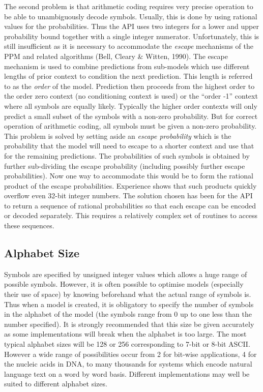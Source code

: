 \documentclass[11pt]{article}
\begin{document}
The second problem is that arithmetic coding requires very precise operation
to be able to unambiguously decode symbols. Usually, this is done by using
rational values for the probabilities. Thus the API uses two integers for a
lower and upper probability bound together with a single integer numerator.
Unfortunately, this is still insufficient as it is necessary to accommodate
the \emph{escape} mechanisms of the PPM and related algorithms (Bell, Cleary
\& Witten, 1990). The escape mechanism is used to combine predictions from
sub-models which use different lengths of prior context to condition the
next prediction. This length is referred to as the \emph{order} of the
model. Prediction then proceeds from the highest order to the order zero
context (no conditioning context is used) or the ``order -1'' context where
all symbols are equally likely. Typically the higher order contexts will
only predict a small subset of the symbols with a non-zero probability. But
for correct operation of arithmetic coding, all symbols must be given a
non-zero probability. This problem is solved by setting aside an \emph{%
escape probability} which is the probability that the model will need to
escape to a shorter context and use that for the remaining predictions. The
probabilities of such symbols is obtained by further sub-dividing the escape
probability (including possibly further escape probabilities). Now one way
to accommodate this would be to form the rational product of the escape
probabilities. Experience shows that such products quickly overflow even
32-bit integer numbers. The solution chosen has been for the API to return a
sequence of rational probabilities so that each escape can be encoded or
decoded separately. This requires a relatively complex set of routines to
access these sequences.

\subsection{Alphabet Size}

Symbols are specified by unsigned integer values which allows a huge range
of possible symbols. However, it is often possible to optimise models
(especially their use of space) by knowing beforehand what the actual range
of symbols is. Thus when a model is created, it is obligatory to specify the
number of symbols in the alphabet of the model (the symbols range from 0
up to one less than the number specified). It is strongly recommended that
this size be given accurately as some implementations will break when the
alphabet is too large. The most typical alphabet sizes will be 128 or 256
corresponding to 7-bit or 8-bit ASCII. However a wide range of possibilities
occur from 2 for bit-wise applications, 4 for the nucleic acids in DNA, to
many thousands for systems which encode natural language text on a word by
word basis. Different implementations may well be suited to different
alphabet sizes.
\end{document}
